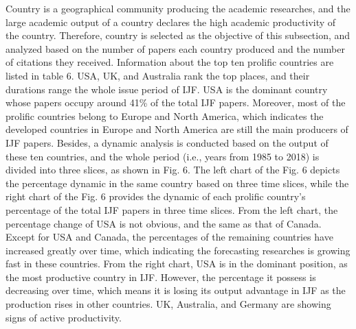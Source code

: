 \documentclass[11pt,a4paper]{elsarticle} %
\begin{document}
Country is a geographical community producing the academic researches,
and the large academic output of a country declares the high academic
productivity of the country. Therefore, country is selected as the
objective of this subsection, and analyzed based on the number of papers
each country produced and the number of citations they received.
Information about the top ten prolific countries are listed in table 6.
USA, UK, and Australia rank the top places, and their durations range
the whole issue period of IJF. USA is the dominant country whose papers
occupy around 41\% of the total IJF papers. Moreover, most of the
prolific countries belong to Europe and North America, which indicates
the developed countries in Europe and North America are still the main
producers of IJF papers. Besides, a dynamic analysis is conducted based
on the output of these ten countries, and the whole period (i.e., years
from 1985 to 2018) is divided into three slices, as shown in Fig. 6. The
left chart of the Fig. 6 depicts the percentage dynamic in the same
country based on three time slices, while the right chart of the Fig. 6
provides the dynamic of each prolific country's percentage of the total
IJF papers in three time slices. From the left chart, the percentage
change of USA is not obvious, and the same as that of Canada. Except for
USA and Canada, the percentages of the remaining countries have
increased greatly over time, which indicating the forecasting researches
is growing fast in these countries. From the right chart, USA is in the
dominant position, as the most productive country in IJF. However, the
percentage it possess is decreasing over time, which means it is losing
its output advantage in IJF as the production rises in other countries.
UK, Australia, and Germany are showing signs of active productivity.

\begin{table}
\centering
\caption{Information about the top ten prolific countries}
\end{table}
\end{document}
